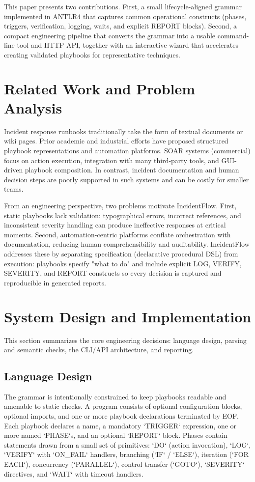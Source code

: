 \documentclass[conference]{IEEEtran}
\begin{document}
This paper presents two contributions. First, a small lifecycle-aligned grammar implemented in ANTLR4 that captures common operational constructs (phases, triggers, verification, logging, waits, and explicit REPORT blocks). Second, a compact engineering pipeline that converts the grammar into a usable command-line tool and HTTP API, together with an interactive wizard that accelerates creating validated playbooks for representative techniques.

\section{Related Work and Problem Analysis}
Incident response runbooks traditionally take the form of textual documents or wiki pages. Prior academic and industrial efforts have proposed structured playbook representations and automation platforms. SOAR systems (commercial) focus on action execution, integration with many third-party tools, and GUI-driven playbook composition. In contrast, incident documentation and human decision steps are poorly supported in such systems and can be costly for smaller teams.

From an engineering perspective, two problems motivate IncidentFlow. First, static playbooks lack validation: typographical errors, incorrect references, and inconsistent severity handling can produce ineffective responses at critical moments. Second, automation-centric platforms conflate orchestration with documentation, reducing human comprehensibility and auditability. IncidentFlow addresses these by separating specification (declarative procedural DSL) from execution: playbooks specify "what to do" and include explicit LOG, VERIFY, SEVERITY, and REPORT constructs so every decision is captured and reproducible in generated reports.

\section{System Design and Implementation}
This section summarizes the core engineering decisions: language design, parsing and semantic checks, the CLI/API architecture, and reporting.

\subsection{Language Design}
The grammar is intentionally constrained to keep playbooks readable and amenable to static checks. A program consists of optional configuration blocks, optional imports, and one or more playbook declarations terminated by EOF. Each playbook declares a name, a mandatory `TRIGGER` expression, one or more named `PHASE`s, and an optional `REPORT` block. Phases contain statements drawn from a small set of primitives: `DO` (action invocation), `LOG`, `VERIFY` with `ON_FAIL` handlers, branching (`IF` / `ELSE`), iteration (`FOR EACH`), concurrency (`PARALLEL`), control transfer (`GOTO`), `SEVERITY` directives, and `WAIT` with timeout handlers.
\end{document}
